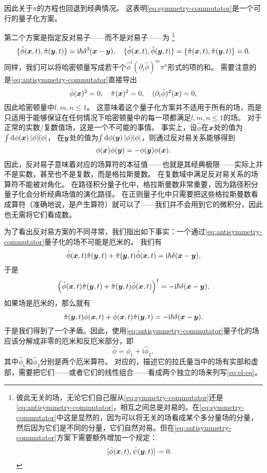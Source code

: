 \documentclass[UTF8, a4paper]{ctexart}
\newcommand*{\ii}{\mathrm{i}}
\begin{document}
因此关于$\pi$的方程也回退到经典情况。
这表明\eqref{eq:symmetry-commutator}是一个可行的量子化方案。

第二个方案是指定反对易子——而不是对易子——为%
\footnote{彼此无关的场，无论它们自己服从\eqref{eq:symmetry-commutator}还是\eqref{eq:antisymmetry-commutator}，相互之间总是对易的。在\eqref{eq:symmetry-commutator}中这是显然的，因为可以将无关的场看成某个多分量场的分量，然后因为它们是不同的分量，它们自然对易。但在\eqref{eq:antisymmetry-commutator}方案下需要额外增加一个规定：
\[
    \comm*{\hat{\phi}(\vb*{x}, t)}{\hat{\psi}(\vb*{y}, t)} = 0.
\]
}
\begin{equation}
    \{\hat{\phi}(\vb*{x}, t), \hat{\pi}(\vb*{y}, t)\} = \ii \hbar \delta^3(\vb*{x} - \vb*{y}), \quad \{\hat{\phi}(\vb*{x}, t), \hat{\phi}(\vb*{y}, t)\} = \{\hat{\pi}(\vb*{x}, t), \hat{\pi}(\vb*{y}, t)\} = 0.
    \label{eq:antisymmetry-commutator}
\end{equation}
同样，我们可以将哈密顿量写成若干个$\hat{\phi}^l (\partial_i \hat{\phi})^m \pi^n$形式的项的和。
需要注意的是\eqref{eq:antisymmetry-commutator}直接导出
\[
    \hat{\phi}(\vb*{x})^2 = 0, \quad \hat{\pi}(\vb*{x})^2 = 0, \quad (\partial_i \hat{\phi})^2(\vb*{x}) = 0,
\]
因此哈密顿量中$l, m, n \leq 1$。
这意味着这个量子化方案并不适用于所有的场，而是只适用于能够保证在任何情况下哈密顿量中的每一项都满足$l, m, n \leq 1$的场。
对于正常的实数/复数值场，这是一个不可能的事情。
事实上，设$\hat{\phi}$在$\vb*{x}$处的值为$\int \dd \phi(\vb*{x}) \dyad{\phi}$，
在$\vb*{y}$处的值为$\int \dd \phi(\vb*{y}) \dyad{\phi}$，则通过反对易关系能够得到
\[
    \phi(\vb*{x}) \phi(\vb*{y}) = - \phi(\vb*{y}) \phi(\vb*{x}).
\]
因此，反对易子意味着对应的场算符的本征值——也就是其经典极限——实际上并不是实数，甚至也不是复数，而是格拉斯曼数。
在复数域中满足反对易关系的场算符不能被对角化。
在路径积分量子化中，格拉斯曼数非常重要，因为路径积分量子化会分析经典场值的演化路径。
在正则量子化中只需要把这些格拉斯曼数看成算符（准确地说，是产生算符）就可以了——我们并不会用到它的微积分，因此也无需将它们看成数。

为了看出反对易方案的不同寻常，我们指出如下事实：一个通过\eqref{eq:antisymmetry-commutator}量子化的场不可能是厄米的。
我们有
\[
    \hat{\phi}(\vb*{x}, t) \hat{\pi} (\vb*{y}, t) + \hat{\pi} (\vb*{y}, t) \hat{\phi} (\vb*{x}, t) = \ii \hbar \delta(\vb*{x} - \vb*{y}),
\]
于是
\[
    \left(\hat{\phi}(\vb*{x}, t) \hat{\pi} (\vb*{y}, t) + \hat{\pi} (\vb*{y}, t) \hat{\phi} (\vb*{x}, t)\right)^\dagger = - \ii \hbar \delta(\vb*{x} - \vb*{y}),
\]
如果场是厄米的，那么就有
\[
    \hat{\pi} (\vb*{y}, t) \hat{\phi} (\vb*{x}, t) + \hat{\phi}(\vb*{x}, t) \hat{\pi} (\vb*{y}, t) = - \ii \hbar \delta(\vb*{x} - \vb*{y}).
\]
于是我们得到了一个矛盾。因此，使用\eqref{eq:antisymmetry-commutator}量子化的场应该分解成非零的厄米和反厄米部分，即
\begin{equation}
    \hat{\phi} = \hat{\phi}_1 + \ii \hat{\phi}_2,
\end{equation}
其中$\hat{\phi}_1$和$\hat{\phi}_2$分别是两个厄米算符。
对应的，描述它的拉氏量当中的场有实部和虚部，需要把它们——或者它们的线性组合——看成两个独立的场来列写\eqref{eq:el-eq}。
\end{document}
